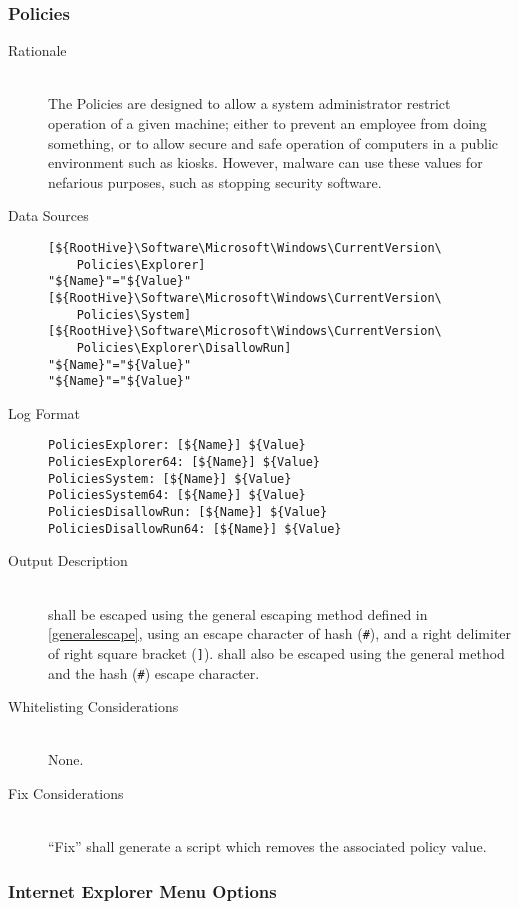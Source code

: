 \subsubsection{Policies}
\begin{description}
\item[Rationale] \hfill \\
The Policies are designed to allow a system administrator restrict operation of
a given machine; either to prevent an employee from doing something, or to allow
secure and safe operation of computers in a public environment such as kiosks.
However, malware can use these values for nefarious purposes, such as stopping
security software.
\item[Data Sources] \hfill
\vspace{-\baselineskip}
\begin{verbatim}
[${RootHive}\Software\Microsoft\Windows\CurrentVersion\
    Policies\Explorer]
"${Name}"="${Value}"
[${RootHive}\Software\Microsoft\Windows\CurrentVersion\
    Policies\System]
[${RootHive}\Software\Microsoft\Windows\CurrentVersion\
    Policies\Explorer\DisallowRun]
"${Name}"="${Value}"
"${Name}"="${Value}"
\end{verbatim}
\item[Log Format] \hfill
\vspace{-\baselineskip}
\begin{verbatim}
PoliciesExplorer: [${Name}] ${Value}
PoliciesExplorer64: [${Name}] ${Value}
PoliciesSystem: [${Name}] ${Value}
PoliciesSystem64: [${Name}] ${Value}
PoliciesDisallowRun: [${Name}] ${Value}
PoliciesDisallowRun64: [${Name}] ${Value}
\end{verbatim}
\item[Output Description] \hfill \\
\var{Name} shall be escaped using the general escaping method defined in
\ref{generalescape}, using an escape character of hash (\verb|#|), and a right
delimiter of right square bracket (\verb|]|).  shall also be escaped
using the general method and the hash (\verb|#|) escape character.
\item[Whitelisting Considerations] \hfill \\
None.
\item[Fix Considerations] \hfill \\
``Fix'' shall generate a script which removes the associated policy value.
\end{description}

\subsubsection{Internet Explorer Menu Options}
